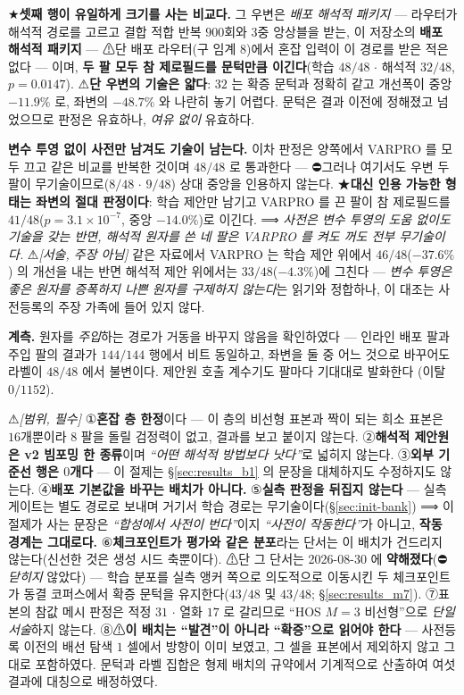 \documentclass[11pt]{report}
\numberwithin{equation}{chapter}
\numberwithin{figure}{chapter}
\numberwithin{table}{chapter}
\begin{document}
★\textbf{셋째 행이 유일하게 크기를 사는 비교다.} 그 우변은 \emph{배포 해석적 패키지}
--- 라우터가 해석적 경로를 고르고 결합 적합 반복 $900$회와 $3$중 앙상블을 받는, 이
저장소의 \textbf{배포 해석적 패키지} --- ⚠단 배포 라우터(구 임계 $8$)에서 혼잡 입력이
이 경로를 받은 적은 없다 --- 이며, \textbf{두 팔 모두 참 제로필드를 문턱만큼
이긴다}(학습 $48/48$ $\cdot$ 해석적 $32/48$, $p = 0.0147$). ⚠\textbf{단 우변의 기술은
얇다}: $32$ 는 확증 문턱과 정확히 같고 개선폭이 중앙 $-11.9\%$ 로, 좌변의 $-48.7\%$ 와
나란히 놓기 어렵다. 문턱은 결과 이전에 정해졌고 넘었으므로 판정은 유효하나,
\emph{여유 없이} 유효하다.

\textbf{변수 투영 없이 사전만 남겨도 기술이 남는다.} 이차 판정은 양쪽에서 VARPRO 를
모두 끄고 같은 비교를 반복한 것이며 $48/48$ 로 통과한다 --- ⛔그러나 여기서도 우변 두
팔이 무기술이므로($8/48$ $\cdot$ $9/48$) 상대 중앙을 인용하지 않는다.
★\textbf{대신 인용 가능한 형태는 좌변의 절대 판정이다}: 학습 제안만 남기고 VARPRO 를
끈 팔이 참 제로필드를 $41/48$($p = 3.1\times10^{-7}$, 중앙 $-14.0\%$)로 이긴다.
⟹ \emph{사전은 변수 투영의 도움 없이도 기술을 갖는 반면, 해석적 원자를 쓴 네 팔은
VARPRO 를 켜도 꺼도 전부 무기술이다.}
⚠\emph{[서술, 주장 아님]} 같은 자료에서 VARPRO 는 학습 제안 위에서 $46/48$($-37.6\%$)
의 개선을 내는 반면 해석적 제안 위에서는 $33/48$($-4.3\%$)에 그친다 --- \emph{변수
투영은 좋은 원자를 증폭하지 나쁜 원자를 구제하지 않는다}는 읽기와 정합하나, 이 대조는
사전등록의 주장 가족에 들어 있지 않다.

\textbf{계측.} 원자를 \emph{주입}하는 경로가 거동을 바꾸지 않음을 확인하였다 --- 인라인
배포 팔과 주입 팔의 결과가 $144/144$ 행에서 비트 동일하고, 좌변을 둘 중 어느 것으로
바꾸어도 라벨이 $48/48$ 에서 불변이다. 제안원 호출 계수기도 팔마다 기대대로 발화한다
(이탈 $0/1152$).

⚠\emph{[범위, 필수]} ①\textbf{혼잡 층 한정}이다 --- 이 층의 비선형 표본과 짝이 되는
희소 표본은 $16$개뿐이라 $8$ 팔을 돌릴 검정력이 없고, 결과를 보고 붙이지 않는다.
②\textbf{해석적 제안원은 v2 빔포밍 한 종류}이며 \emph{``어떤 해석적 방법보다
낫다''}로 넓히지 않는다. ③\textbf{외부 기준선 행은 $0$개다} --- 이 절제는
\S\ref{sec:results_b1} 의 문장을 대체하지도 수정하지도 않는다. ④\textbf{배포 기본값을
바꾸는 배치가 아니다.} ⑤\textbf{실측 판정을 뒤집지 않는다} --- 실측 게이트는 별도
경로로 보내며 거기서 학습 경로는 무기술이다(\S\ref{sec:init-bank}) ⟹ 이 절제가 사는
문장은 \emph{``합성에서 사전이 번다''}이지 \emph{``사전이 작동한다''}가 아니고,
\textbf{작동 경계는 그대로다.} ⑥\textbf{체크포인트가 평가와 같은 분포}라는 단서는 이
배치가 건드리지 않는다(신선한 것은 생성 시드 축뿐이다). ⚠단 그 단서는 2026-08-30 에 \textbf{약해졌다}(⛔\emph{닫히지} 않았다) --- 학습 분포를
실측 앵커 쪽으로 의도적으로 이동시킨 두 체크포인트가 동결 코퍼스에서 확증 문턱을
유지한다($43/48$ 및 $43/48$; \S\ref{sec:results_m7}). ⑦표본의 참값 메시 판정은 적정
$31$ $\cdot$ 열화 $17$ 로 갈리므로 ``HOS $M{=}3$ 비선형''으로 \emph{단일 서술}하지
않는다. ⑧⚠\textbf{이 배치는 ``발견''이 아니라 ``확증''으로 읽어야 한다} --- 사전등록
이전의 배선 탐색 $1$ 셀에서 방향이 이미 보였고, 그 셀을 표본에서 제외하지 않고 그대로
포함하였다. 문턱과 라벨 집합은 형제 배치의 규약에서 기계적으로 산출하여 여섯 결과에
대칭으로 배정하였다.
\end{document}
